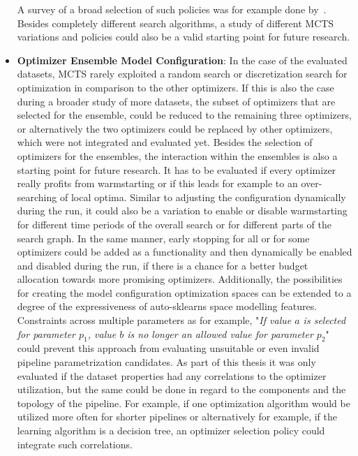 \begin{itemize}
    A survey of a broad selection of such policies was for example done by~\textcite{Browne-Policies}.
    Besides completely different search algorithms, a study of different MCTS variations and policies could also be a valid starting point for future research.
    \item \textbf{Optimizer Ensemble Model Configuration}: In the case of the evaluated datasets, MCTS rarely exploited a random search or discretization search for optimization in comparison to the other optimizers.
    If this is also the case during a broader study of more datasets, the subset of optimizers that are selected for the ensemble, could be reduced to the remaining three optimizers, or alternatively the two optimizers could be replaced by other optimizers, which were not integrated and evaluated yet.\newline
    Besides the selection of optimizers for the ensembles, the interaction within the ensembles is also a starting point for future research.
    It has to be evaluated if every optimizer really profits from warmstarting or if this leads for example to an over-searching of local optima.\newline
    Similar to adjusting the configuration dynamically during the run, it could also be a variation to enable or disable warmstarting for different time periods of the overall search or for different parts of the search graph.
    In the same manner, early stopping for all or for some optimizers could be added as a functionality and then dynamically be enabled and disabled during the run, if there is a chance for a better budget allocation towards more promising optimizers.\newline
    Additionally, the possibilities for creating the model configuration optimization spaces can be extended to a degree of the expressiveness of auto-sklearns space modelling features.
    Constraints across multiple parameters as for example, "\textit{If value $a$ is selected for parameter $p_1$, value $b$ is no longer an allowed value for parameter $p_2$}" could prevent this approach from evaluating unsuitable or even invalid pipeline parametrization candidates.\newline
    As part of this thesis it was only evaluated if the dataset properties had any correlations to the optimizer utilization, but the same could be done in regard to the components and the topology of the pipeline.
    For example, if one optimization algorithm would be utilized more often for shorter pipelines or alternatively for example, if the learning algorithm is a decision tree, an optimizer selection policy could integrate such correlations.

\end{itemize}
